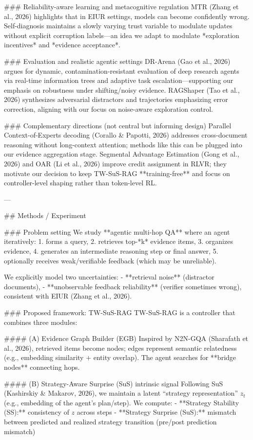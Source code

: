 ### Reliability-aware learning and metacognitive regulation  
MTR (Zhang et al., 2026) highlights that in EIUR settings, models can become confidently wrong. Self-diagnosis maintains a slowly varying trust variable to modulate updates without explicit corruption labels—an idea we adapt to modulate *exploration incentives* and *evidence acceptance*.

### Evaluation and realistic agentic settings  
DR-Arena (Gao et al., 2026) argues for dynamic, contamination-resistant evaluation of deep research agents via real-time information trees and adaptive task escalation—supporting our emphasis on robustness under shifting/noisy evidence. RAGShaper (Tao et al., 2026) synthesizes adversarial distractors and trajectories emphasizing error correction, aligning with our focus on noise-aware exploration control.

### Complementary directions (not central but informing design)  
Parallel Context-of-Experts decoding (Corallo & Papotti, 2026) addresses cross-document reasoning without long-context attention; methods like this can be plugged into our evidence aggregation stage. Segmental Advantage Estimation (Gong et al., 2026) and OAR (Li et al., 2026) improve credit assignment in RLVR; they motivate our decision to keep TW-SuS-RAG **training-free** and focus on controller-level shaping rather than token-level RL.

---

## Methods / Experiment  

### Problem setting  
We study **agentic multi-hop QA** where an agent iteratively:
1. forms a query,
2. retrieves top-*k* evidence items,
3. organizes evidence,
4. generates an intermediate reasoning step or final answer,
5. optionally receives weak/verifiable feedback (which may be unreliable).

We explicitly model two uncertainties:
- **retrieval noise** (distractor documents),
- **unobservable feedback reliability** (verifier sometimes wrong), consistent with EIUR (Zhang et al., 2026).

### Proposed framework: TW-SuS-RAG  
TW-SuS-RAG is a controller that combines three modules:

#### (A) Evidence Graph Builder (EGB)  
Inspired by N2N-GQA (Sharafath et al., 2026), retrieved items become nodes; edges represent semantic relatedness (e.g., embedding similarity + entity overlap). The agent searches for **bridge nodes** connecting hops.

#### (B) Strategy-Aware Surprise (SuS) intrinsic signal  
Following SuS (Kashirskiy & Makarov, 2026), we maintain a latent “strategy representation” \( z_t \) (e.g., embedding of the agent’s plan/step). We compute:
- **Strategy Stability (SS):** consistency of \(z\) across steps  
- **Strategy Surprise (SuS):** mismatch between predicted and realized strategy transition (pre/post prediction mismatch)

